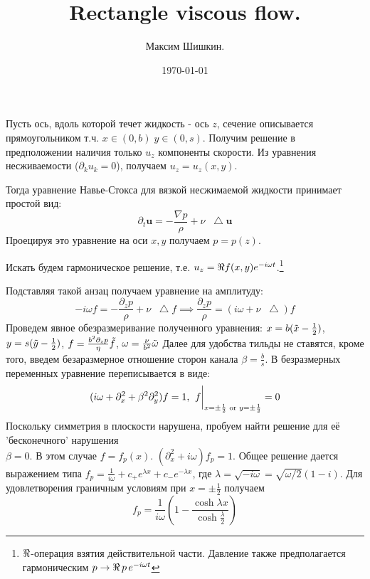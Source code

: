 \documentclass[a4paper,12pt]{article}
\author{Максим Шишкин.}
\title{Rectangle viscous flow.}
\date{\today}
\newcommand*\Laplace{\mathop{}\!\mathbin\bigtriangleup}
\theoremstyle{plain} %
\theoremstyle{definition} %
\theoremstyle{remark} %
\begin{document}
\maketitle
{}

Пусть ось, вдоль которой течет жидкость - ось $z$, сечение описывается прямоугольником т.ч. $x\in(0,b)\; y\in (0,s)$.
Получим решение в предположении наличия только $u_z$ компоненты скорости.
Из уравнения несживаемости ($\partial_k u_k=0$), получаем $u_z = u_z(x,y)$.

Тогда уравнение Навье-Стокса для вязкой несжимаемой жидкости принимает простой вид:
\begin{equation}\label{eq:navie-stoks}
    \partial_t \mathbf{u} =- \frac{\nabla p}{\rho} + \nu \Laplace{\mathbf{u}}
\end{equation}
Проецируя это уравнение на оси $x,y$ получаем $p=p(z)$. 

Искать будем гармоническое решение, т.е. $u_z = \real f(x,y) e^{-i\omega t}$.\footnote{$\real$-операция взятия действительной части. Давление также предполагается гармоническим $p\to \real\, p\, e^{-i\omega t}$}

Подставляя такой анзац получаем уравнение на амплитуду:
\begin{equation}
    -i\omega  f = -\frac{\partial_z p}{\rho} + \nu \Laplace{f}\implies \frac{\partial_z p}{\rho} = (i\omega + \nu\Laplace)f
\end{equation}
Проведем явное обезразмеривание полученного уравнения:
 $x = b(\Tilde{x}-\frac{1}{2})$,
 $y = s(\Tilde{y}-\frac{1}{2})$,
 $f = \frac{b^2\partial_z p}{\eta} \Tilde{f}$,
 $\omega = \frac{\nu}{b^2}\Tilde{\omega}$
Далее для удобства тильды не ставятся, кроме того, введем безаразмерное отношение сторон канала $\beta = \frac{b}{s}$.
В безразмерных переменных уравнение переписывается в виде:
\begin{equation}\label{eq:eq_dimen}
    (i\omega + \partial_{x}^2 + \beta^2 \partial_y^2)f=1, \; \eval{f}_{x=\pm\frac{1}{2} \text{ or } y=\pm\frac{1}{2}} = 0 
\end{equation}
    Поскольку симметрия в плоскости нарушена, пробуем найти решение для её 'бесконечного' нарушения \\$\beta=0$.
    В этом случае $f = f_p (x)$. $(\partial_x^2 +i\omega)f_p = 1$. Общее решение дается выражением типа $f_p = \frac{1}{i\omega} + c_+ e^{\lambda x} + c_- e^{-\lambda x}$, где $\lambda = \sqrt{-i\omega} = \sqrt{\omega/2}(1-i)$.
    Для удовлетворения граничным условиям при $x=\pm \frac{1}{2}$ получаем \begin{equation}\boxed{f_p = \frac{1}{i\omega}\left(1-\frac{\cosh{\lambda x}}{\cosh{\frac{\lambda}{2}}}\right)}\end{equation}
\end{document}
